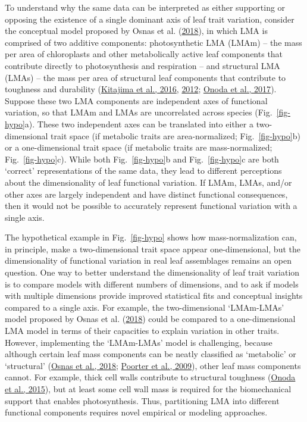 \documentclass[
  12pt,
  letterpaper,
  DIV=11,
  numbers=noendperiod]{scrartcl}
\begin{document}
To understand why the same data can be interpreted as either supporting
or opposing the existence of a single dominant axis of leaf trait
variation, consider the conceptual model proposed by Osnas et al.
(\protect\hyperlink{ref-Osnas2018}{2018}), in which LMA is comprised of
two additive components: photosynthetic LMA (LMAm) -- the mass per area
of chloroplasts and other metabolically active leaf components that
contribute directly to photosynthesis and respiration -- and structural
LMA (LMAs) -- the mass per area of structural leaf components that
contribute to toughness and durability
(\protect\hyperlink{ref-Kitajima2016}{Kitajima et al., 2016},
\protect\hyperlink{ref-Kitajima2012}{2012};
\protect\hyperlink{ref-Onoda2017}{Onoda et al., 2017}). Suppose these
two LMA components are independent axes of functional variation, so that
LMAm and LMAs are uncorrelated across species (Fig.~\ref{fig-hypo}a).
These two independent axes can be translated into either a
two-dimensional trait space (if metabolic traits are area-normalized;
Fig.~\ref{fig-hypo}b) or a one-dimensional trait space (if metabolic
traits are mass-normalized; Fig.~\ref{fig-hypo}c). While both
Fig.~\ref{fig-hypo}b and Fig.~\ref{fig-hypo}c are both `correct'
representations of the same data, they lead to different perceptions
about the dimensionality of leaf functional variation. If LMAm, LMAs,
and/or other axes are largely independent and have distinct functional
consequences, then it would not be possible to accurately represent
functional variation with a single axis.

The hypothetical example in Fig.~\ref{fig-hypo} shows how
mass-normalization can, in principle, make a two-dimensional trait space
appear one-dimensional, but the dimensionality of functional variation
in real leaf assemblages remains an open question. One way to better
understand the dimensionality of leaf trait variation is to compare
models with different numbers of dimensions, and to ask if models with
multiple dimensions provide improved statistical fits and conceptual
insights compared to a single axis. For example, the two-dimensional
`LMAm-LMAs' model proposed by Osnas et al.
(\protect\hyperlink{ref-Osnas2018}{2018}) could be compared to a
one-dimensional LMA model in terms of their capacities to explain
variation in other traits. However, implementing the `LMAm-LMAs' model
is challenging, because although certain leaf mass components can be
neatly classified as `metabolic' or `structural'
(\protect\hyperlink{ref-Osnas2018}{Osnas et al., 2018};
\protect\hyperlink{ref-Poorter2009}{Poorter et al., 2009}), other leaf
mass components cannot. For example, thick cell walls contribute to
structural toughness (\protect\hyperlink{ref-Onoda2015}{Onoda et al.,
2015}), but at least some cell wall mass is required for the
biomechanical support that enables photosynthesis. Thus, partitioning
LMA into different functional components requires novel empirical or
modeling approaches.
\end{document}
